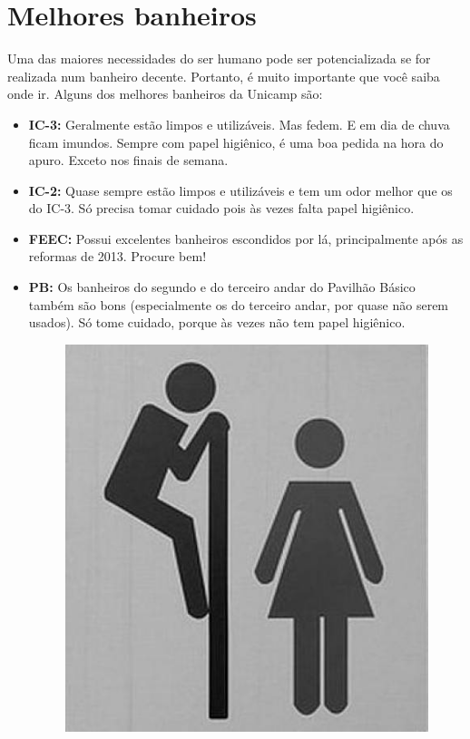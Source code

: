 
\section{Melhores banheiros}

Uma das maiores necessidades do ser humano pode ser potencializada se for
realizada num banheiro decente. Portanto, é muito importante que você saiba onde
ir. Alguns dos melhores banheiros da Unicamp são:

\begin{itemize}
    \item  \textbf{IC-3:} Geralmente estão limpos e utilizáveis. Mas fedem. E em 
        dia de chuva ficam imundos. Sempre com papel higiênico, é uma boa pedida 
        na hora do apuro. Exceto nos finais de semana.

    \item  \textbf{IC-2:} Quase sempre estão limpos e utilizáveis e tem um odor
        melhor que os do IC-3. Só precisa tomar cuidado pois às vezes falta
        papel higiênico.

    \item  \textbf{FEEC:} Possui excelentes banheiros escondidos por lá,
        principalmente após as reformas de 2013. Procure bem!

    \item  \textbf{PB:} Os banheiros do segundo e do terceiro andar do Pavilhão
        Básico também são bons (especialmente os do terceiro andar, por quase
        não serem usados). Só tome cuidado, porque às vezes não tem papel
        higiênico.

        \begin{figure}[h!]
            \centering
            \includegraphics[width=.45\textwidth]{img/unicamp/banheiro.jpg}
        \end{figure}


\end{itemize}
